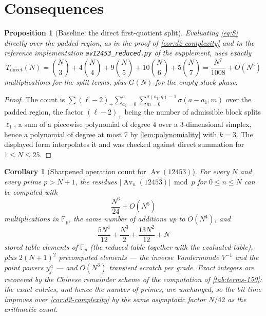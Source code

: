 \documentclass[11pt,reqno]{amsart}
\newtheorem{proposition}[theorem]{Proposition}
\newtheorem{corollary}[theorem]{Corollary}
\theoremstyle{definition}
\theoremstyle{remark}
\newcommand{\Av}{\operatorname{Av}}
\begin{document}
\section{Consequences}\label{sec:consequences}

\begin{proposition}[Baseline: the direct first-quotient
split]\label{prop:baseline-count}
Evaluating \eqref{eq:S} directly over the padded region, as in the proof of
\cref{cor:d2-complexity} and in the reference implementation
\texttt{av12453\_reduced.py} of the supplement, uses exactly
\begin{equation}\label{eq:baseline}
 T_{\mathrm{direct}}(N)=\binom N3+4\binom N4+9\binom N5+10\binom N6
 +5\binom N7=\frac{N^7}{1008}+O(N^6)
\end{equation}
multiplications for the split terms, plus $G(N)$ for the empty-stack phase.
\end{proposition}

\begin{proof}
The count is
$\sum(\ell-2)_+\sum_{a_1=0}^{a}\sum_{m=0}^{\sigma(a_1,q)-1}
\sigma(a-a_1,m)$ over the padded region, the factor $(\ell-2)_+$ being the
number of admissible block splits $\ell_1$, a sum of a piecewise polynomial of
degree $4$ over a $3$-dimensional simplex, hence a polynomial of degree at
most $7$
by \cref{lem:polynomiality} with $k=3$.  The displayed form interpolates it and was
checked against direct summation for $1\leq N\leq25$.
\end{proof}

\begin{corollary}[Sharpened operation count for
$\Av(12453)$]\label{cor:sa-complexity}
For every $N$ and every prime $p>N+1$, the residues
$|\Av_n(12453)|\bmod p$ for $0\leq n\leq N$ can be computed with
\[
 \frac{N^6}{24}+O(N^5)
\]
multiplications in $\mathbb F_p$, the same number of additions up to
$O(N^4)$, and
\[
 \frac{5N^4}{12}+\frac{N^3}{2}+\frac{13N^2}{12}+N
\]
stored table elements of $\mathbb F_p$ (the reduced table together with the
evaluated table), plus $2(N+1)^2$ precomputed elements --- the inverse
Vandermonde $V^{-1}$ and the point powers $y_j^{\,a}$ --- and $O(N^3)$
transient scratch per grade.  Exact integers are recovered by the
Chinese remainder scheme of the computation of \cref{tab:terms-150}: the exact entries, and
hence the number of primes, are unchanged, so the bit time improves over
\cref{cor:d2-complexity} by the same asymptotic factor $N/42$ as the
arithmetic count.
\end{corollary}
\end{document}
